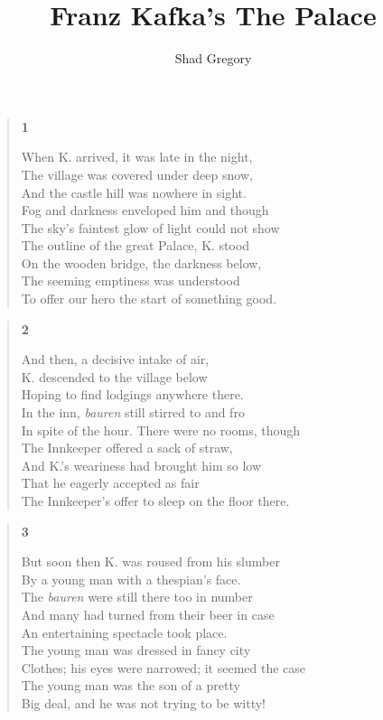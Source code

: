 \documentclass{article}
\title{Franz Kafka's The Palace}
\author{Shad Gregory}
\date{}
\begin{document}
\maketitle
\begin{verse}
  \begin{center}
    \textbf{1} \\
  \end{center}
  When K. arrived, it was late in the night, \\
  The village was covered under deep snow, \\
  And the castle hill was nowhere in sight. \\
  Fog and darkness enveloped him and though \\
  The sky's faintest glow of light could not show \\
  The outline of the great Palace, K. stood \\
  On the wooden bridge, the darkness below, \\
  The seeming emptiness was understood \\
  To offer our hero the start of something good.
\end{verse}
\begin{verse}
  \begin{center}
    \textbf{2} \\
  \end{center}
  And then, a decisive intake of air, \\
  K. descended to the village below \\
  Hoping to find lodgings anywhere there. \\
  In the inn, \textit{bauren} still stirred to and fro \\
  In spite of the hour. There were no rooms, though \\
  The Innkeeper offered a sack of straw, \\
  And K.'s weariness had brought him so low \\
  That he eagerly accepted as fair \\
  The Innkeeper's offer to sleep on the floor there. \\
\end{verse}
\begin{verse}
  \begin{center}
    \textbf{3} \\
  \end{center}
  But soon then K. was roused from his slumber \\
  By a young man with a thespian's face. \\
  The \textit{bauren} were still there too in number \\
  And many had turned from their beer in case \\
  An entertaining spectacle took place. \\
  The young man was dressed in fancy city \\
  Clothes; his eyes were narrowed; it seemed the case \\
  The young man was the son of a pretty \\
  Big deal, and he was not trying to be witty!
\end{verse}
\end{document}

